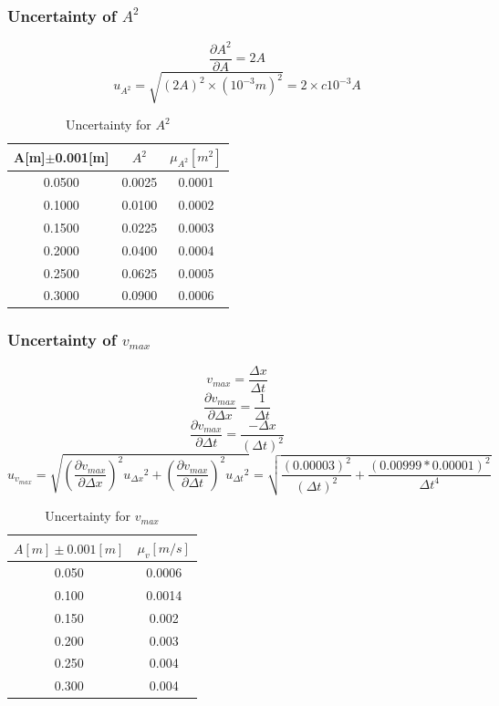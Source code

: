 \documentclass[12pt,a4paper]{article}
\begin{document}
\subsubsection{Uncertainty of $A^2$}
$$\frac{\partial A^2}{\partial A}=2A$$
$$u_{A^2}=\sqrt{(2A)^2\times (10^{-3}m)^2}=2\times c10^{-3}A$$
\begin{table}[H]
    \centering
        \begin{tabular}{|c|c|c|}
            \hline
          A[m]$\pm$0.001[m]  & $A^2$ &   $\mu_{A^2}[m^2]$     \\\hline
        0.0500 & 0.0025& 0.0001 \\\hline
        0.1000 & 0.0100 & 0.0002 \\\hline
        0.1500 & 0.0225 & 0.0003 \\\hline
        0.2000 & 0.0400 & 0.0004 \\\hline
        0.2500 & 0.0625 & 0.0005 \\\hline
        0.3000 & 0.0900 & 0.0006\\\hline
        \end{tabular}
        \caption{Uncertainty for $A^2$}
        \label{unceratinyasquare}
    \end{table}

\subsubsection{Uncertainty of $v_{max}$}
$$v_{max}=\frac{\Delta x}{\Delta t}$$
$$\frac{\partial v_{max}}{\partial \Delta x}=\frac{1}{\Delta t}$$
$$\frac{\partial v_{max}}{\partial \Delta t}=\frac{-\Delta x}{(\Delta t)^2}$$
$$u_{v_{max}}=\sqrt{(\frac{\partial v_{max}}{\partial \Delta x})^2{u_{\Delta x}}^2+(\frac{\partial v_{max}}{\partial \Delta t})^2{u_{\Delta t}}^2}=\sqrt{\frac{(0.00003)^2}{(\Delta t)^2}+\frac{(0.00999*0.00001)^2}{\Delta t^4}}$$
\begin{table}[H]
    \centering
    \begin{tabular}{|c|c|}\hline
    $A[m]\pm 0.001[m]$& $\mu_v[m/s]$\\\hline
    0.050 & 0.0006 \\\hline
    0.100 & 0.0014 \\\hline
    0.150 & 0.002  \\\hline
    0.200 & 0.003  \\\hline
    0.250 & 0.004  \\\hline
    0.300 & 0.004 \\\hline
    \end{tabular}
    \caption{Uncertainty for $v_{max}$}
    \label{uncertaintyvmax}
\end{table}
\end{document}
